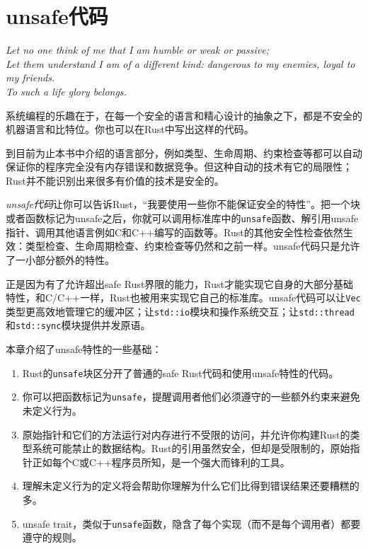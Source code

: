 \chapter{unsafe代码}\label{ch22}

\emph{Let no one think of me that I am humble or weak or passive; \\
Let them understand I am of a diﬀerent kind: dangerous to my enemies, loyal to my friends. \\
To such a life glory belongs.}

系统编程的乐趣在于，在每一个安全的语言和精心设计的抽象之下，都是不安全的机器语言和比特位。你也可以在Rust中写出这样的代码。

到目前为止本书中介绍的语言部分，例如类型、生命周期、约束检查等都可以自动保证你的程序完全没有内存错误和数据竞争。但这种自动的技术有它的局限性；Rust并不能识别出来很多有价值的技术是安全的。

\emph{unsafe代码}让你可以告诉Rust，“我要使用一些你不能保证安全的特性”。把一个块或者函数标记为unsafe之后，你就可以调用标准库中的\texttt{unsafe}函数、解引用unsafe指针、调用其他语言例如C和C++编写的函数等。Rust的其他安全性检查依然生效：类型检查、生命周期检查、约束检查等仍然和之前一样。unsafe代码只是允许了一小部分额外的特性。

正是因为有了允许超出safe Rust界限的能力，Rust才能实现它自身的大部分基础特性，和C/C++一样，Rust也被用来实现它自己的标准库。unsafe代码可以让\texttt{Vec}类型更高效地管理它的缓冲区；让\texttt{std::io}模块和操作系统交互；让\texttt{std::thread}和\texttt{std::sync}模块提供并发原语。

本章介绍了unsafe特性的一些基础：

\begin{enumerate}
    \item Rust的\texttt{unsafe}块区分开了普通的safe Rust代码和使用unsafe特性的代码。
    \item 你可以把函数标记为\texttt{unsafe}，提醒调用者他们必须遵守的一些额外约束来避免未定义行为。
    \item 原始指针和它们的方法运行对内存进行不受限的访问，并允许你构建Rust的类型系统可能禁止的数据结构。Rust的引用虽然安全，但却是受限制的，原始指针正如每个C或C++程序员所知，是一个强大而锋利的工具。
    \item 理解未定义行为的定义将会帮助你理解为什么它们比得到错误结果还要糟糕的多。
    \item unsafe trait，类似于\texttt{unsafe}函数，隐含了每个实现（而不是每个调用者）都要遵守的规则。
\end{enumerate}


